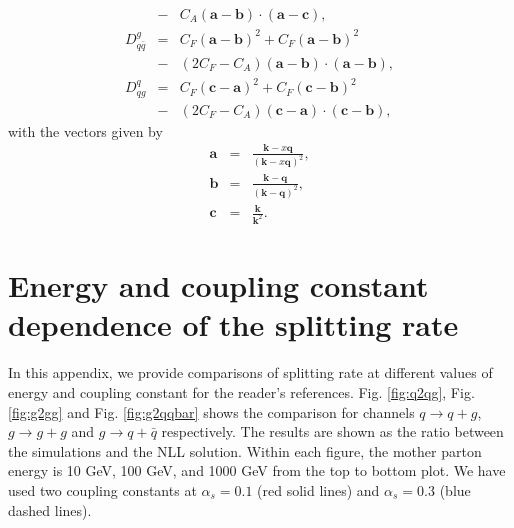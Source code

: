 \documentclass[aps, prc, reprint, amsmath, groupedaddress, nofootinbib]{revtex4-1}
\begin{document}
\begin{appendices}
\begin{eqnarray}
&-& C_A (\mathbf{a}-\mathbf{b})\cdot (\mathbf{a}-\mathbf{c}),
\\
D_{q\bar{q}}^{g} &=& 
C_F(\mathbf{a}-\mathbf{b})^2 + C_F(\mathbf{a}-\mathbf{b})^2 \\\nonumber
&-& (2C_F-C_A) (\mathbf{a}-\mathbf{b})\cdot (\mathbf{a}-\mathbf{b}),
\\
D_{qg}^{q} &=& 
C_F(\mathbf{c}-\mathbf{a})^2 + C_F(\mathbf{c}-\mathbf{b})^2 \\\nonumber
&-& (2C_F-C_A) (\mathbf{c}-\mathbf{a})\cdot (\mathbf{c}-\mathbf{b}),
\end{eqnarray}
with the vectors given by
\begin{eqnarray}
\mathbf{a} &=& \frac{\mathbf{k} - x\mathbf{q}}{(\mathbf{k} - x\mathbf{q})^2},\\
\mathbf{b} &=& \frac{\mathbf{k} - \mathbf{q}}{(\mathbf{k} - \mathbf{q})^2},\\
\mathbf{c} &=&  \frac{\mathbf{k}}{\mathbf{k}^2}.
\end{eqnarray}

\section{Energy and coupling constant dependence of the splitting rate}
\label{app:tune-spectrum}
In this appendix, we provide comparisons of splitting rate at different values of energy and coupling constant for the reader's references.
Fig. \ref{fig:q2qg}, Fig. \ref{fig:g2gg} and Fig. \ref{fig:g2qqbar} shows the comparison for channels $q\rightarrow q+g$, $g\rightarrow g+g$ and $g\rightarrow q+\bar{q}$ respectively.
The results are shown as the ratio between the simulations and the NLL solution.
Within each figure, the mother parton energy is 10 GeV, 100 GeV, and 1000 GeV from the top to bottom plot.
We have used two coupling constants at $\alpha_s = 0.1$ (red solid lines) and $\alpha_s = 0.3$ (blue dashed lines).


\end{appendices}
\end{document}
